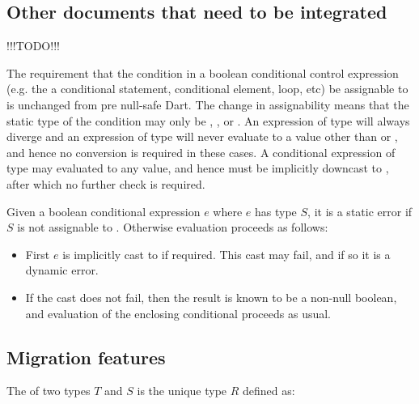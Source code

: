 \documentclass[makeidx]{article}
\begin{document}

\subsection{Other documents that need to be integrated}
\LMLabel{}

!!!TODO!!!

The requirement that the condition in a boolean conditional control expression
(e.g. the a conditional statement, conditional element,  loop, etc) be
assignable to  is unchanged from pre null-safe Dart.  The change in
assignability means that the static type of the condition may only be \DYNAMIC,
, or .  An expression of type  will
always diverge and an expression of type  will never evaluate to a value
other than  or , and hence no conversion is required in these
cases.  A conditional expression of type \DYNAMIC{} may evaluated to any value,
and hence must be implicitly downcast to , after which no further check is
required.

Given a boolean conditional expression $e$ where $e$ has type $S$, it is a
static error if $S$ is not assignable to .
Otherwise evaluation proceeds as follows:

\begin{itemize}
\item First $e$ is implicitly cast to  if required.
  This cast may fail, and if so it is a dynamic error.
\item If the cast does not fail, then the result is known to be a non-null
    boolean, and evaluation of the enclosing conditional proceeds as usual.
\end{itemize}

\subsection{Migration features}

The \TopMergeTypeName{} of two types $T$ and $S$ is the unique type $R$ defined
as:
\end{document}
